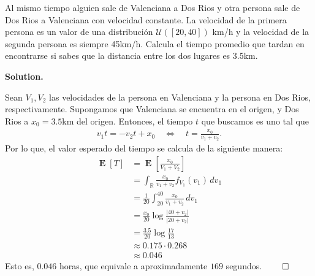 \documentclass{article}
\theoremstyle{problemstyle}
\newenvironment{solution}{%
  \begin{mdframed}[linewidth=0.8pt,linecolor=Gray,backgroundcolor=Gray!5,roundcorner=5pt]%
  \noindent\textbf{Solution.}%
}{%
\hfill $ \qed $ 
  \end{mdframed}%
}
\newcommand{\R}{\mathbb R}
\newcommand{\abs}[1]{\lvert #1 \rvert}
\DeclareMathOperator{\E}{\mathbf{E}}
\begin{document}
\begin{problem}
Al mismo tiempo alguien sale de Valenciana a Dos Rios y otra persona sale de
Dos Rios a Valenciana con velocidad constante. La velocidad de la primera
persona es un valor de una distribuci\'on $ \mathcal U([20, 40])$ km/h y la
velocidad de la segunda persona es siempre 45km/h. Calcula el tiempo promedio
que tardan en encontrarse si sabes que la distancia entre los dos lugares es
3.5km.
\end{problem}
\begin{solution}
	Sean $ V_1, V_2 $ las velocidades de la persona en Valenciana y la persona en Dos Rios, respectivamente. Supongamos que Valenciana se encuentra en el origen, y Dos Rios a $ x_0 = 3.5 $km del origen. Entonces, el tiempo $ t $ que buscamos es uno tal que
	\begin{align*}
		v_1 t = -v_2 t + x_0\quad \iff \quad t = \frac{x_0}{v_1+v_2}.
	\end{align*}
	Por lo que, el valor esperado del tiempo se calcula de la siguiente manera:
	\begin{align*}
		\E[T] & = \E\left[\frac{x_0}{V_1+V_2}\right]                    \\
		      & = \int_{\R} \frac{x_0}{v_1+v_2} f_{V_1}(v_1)\,dv_1      \\
		      & = \frac{1}{20}\int_{20}^{40} \frac{x_0}{v_1+v_2} \,dv_1 \\
		      & = \frac{x_0}{20} \log\frac{\abs{40+v_2}}{\abs{20+v_2}}  \\
		      & = \frac{3.5}{20}\log \frac{17}{13}                      \\
		      & \approx  0.175\cdot 0.268                               \\
		      & \approx 0.046
	\end{align*}
	Esto es, $ 0.046 $ horas, que equivale a aproximadamente $ 169 $ segundos.
\end{solution}
\end{document}
